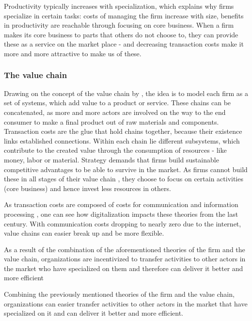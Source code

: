 		Productivity typically increases with specialization, which explains why firms specialize in certain tasks: costs of managing the firm increase with size,  benefits in productivity are reachable through focusing on core business.
		When a firm makes its core business to parts that others do not choose to, they can provide these as a service on the market place - and decreasing transaction costs make it more and more attractive to make us of these. 
		
		\subsubsection{The value chain}
		Drawing on the concept of the value chain by \cite{porter1985}, the idea is to model each firm as a set of systems, which add value to a product or service. These chains can be concatenated, as more and more actors are involved on the way to the end consumer to make a final product out of raw materials and components. Transaction costs are the glue that hold chains together, because their existence links established connections.  Within each chain lie different subsystems, which contribute to the created value through the consumption of resources - like money, labor or material. Strategy demands that firms build sustainable competitive advantages to be able to survive in the market. As firms cannot build these in all stages of their value chain \citep{Ramachandran2004}, they choose to focus on certain activities (core business) and hence invest less resources in others. 
		
		As transaction costs are composed of costs for communication and information processing \citep{evansted}, one can see how digitalization impacts these theories from the last century. With communication costs dropping to nearly zero due to the internet, value chains can easier break up and be more flexible. 
		
		As a result of the combination of the aforementioned theories of the firm and the value chain, organizations are incentivized to transfer activities to other actors in the market who have specialized on them and therefore can deliver it better and more efficient 
		
		Combining the previously mentioned theories of the firm and the value chain, organizations can easier transfer activities to other actors in the market that have specialized on it and can deliver it better and more efficient.  
		
